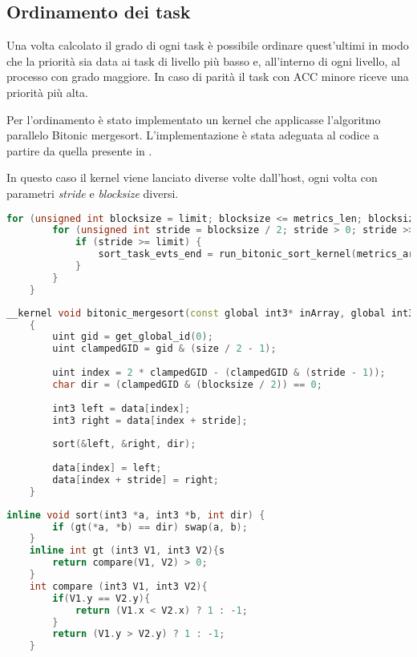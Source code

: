 \subsection{Ordinamento dei task}
Una volta calcolato il grado di ogni task è possibile ordinare quest'ultimi in modo che la priorità sia data ai task di livello più basso e, all'interno di ogni livello, al processo con grado maggiore.
In caso di parità il task con ACC minore riceve una priorità più alta.

Per l'ordinamento è stato implementato un kernel che applicasse l'algoritmo parallelo Bitonic mergesort. L'implementazione è stata adeguata al codice a partire da quella presente in \cite{parallelsort}.

In questo caso il kernel viene lanciato diverse volte dall'host, ogni volta con parametri \textit{stride} e \textit{blocksize} diversi.

\begin{lstlisting}[language=C++, caption={Bitonic mergesort host code},captionpos=b]
	for (unsigned int blocksize = limit; blocksize <= metrics_len; blocksize <<= 1) {
		for (unsigned int stride = blocksize / 2; stride > 0; stride >>= 1) {
			if (stride >= limit) {
				sort_task_evts_end = run_bitonic_sort_kernel(metrics_array_len, stride, blocksize);
			}
		}
	}
\end{lstlisting}

\begin{lstlisting}[language=C++, caption={Bitonic mergesort kernel for metrics array, source: \url{https://github.com/Gram21/GPUSorting}},captionpos=b]
	__kernel void bitonic_mergesort(const global int3* inArray, global int3* outArray, const uint size, const uint blocksize, const uint stride)
	{
		uint gid = get_global_id(0);
		uint clampedGID = gid & (size / 2 - 1);
		
		uint index = 2 * clampedGID - (clampedGID & (stride - 1));
		char dir = (clampedGID & (blocksize / 2)) == 0;
		
		int3 left = data[index];
		int3 right = data[index + stride];
		
		sort(&left, &right, dir);
		
		data[index] = left;
		data[index + stride] = right;
	}
\end{lstlisting}

\begin{lstlisting}[language=C++, caption={Sort utilities},captionpos=b]
	inline void sort(int3 *a, int3 *b, int dir) {
		if (gt(*a, *b) == dir) swap(a, b);
	}
	inline int gt (int3 V1, int3 V2){s
		return compare(V1, V2) > 0;
	}
	int compare (int3 V1, int3 V2){
		if(V1.y == V2.y){
			return (V1.x < V2.x) ? 1 : -1;
		}
		return (V1.y > V2.y) ? 1 : -1;
	}
\end{lstlisting}

